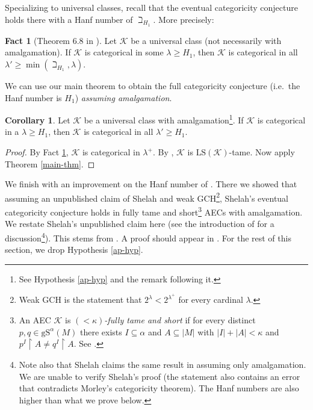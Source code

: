 \documentclass[12pt]{amsart}
\theoremstyle{definition}
\newtheorem{cor}[mydef]{Corollary}
\newtheorem{fact}[mydef]{Fact}
\begin{document}
Specializing to universal classes, recall that the eventual categoricity conjecture holds there with a Hanf number of $\beth_{H_1}$. More precisely:

\begin{fact}[Theorem 6.8 in \cite{ap-universal-v8}]\label{univ-fact}
  Let ${\mathcal{K}}$ be a universal class (not necessarily with amalgamation). If ${\mathcal{K}}$ is categorical in some $\lambda \ge H_1$, then ${\mathcal{K}}$ is categorical in all $\lambda' \ge \min (\beth_{H_1}, \lambda)$.
\end{fact}

We can use our main theorem to obtain the full categoricity conjecture (i.e.\ the Hanf number is $H_1$) \emph{assuming amalgamation}.

\begin{cor}\label{improved-univ-categ}
  Let ${\mathcal{K}}$ be a universal class with amalgamation\footnote{See Hypothesis \ref{ap-hyp} and the remark following it.}. If ${\mathcal{K}}$ is categorical in a $\lambda \ge H_1$, then ${\mathcal{K}}$ is categorical in all $\lambda' \ge H_1$.
\end{cor}
\begin{proof}
  By Fact \ref{univ-fact}, ${\mathcal{K}}$ is categorical in $\lambda^+$. By \cite[Corollary 3.8]{ap-universal-v8}, ${\mathcal{K}}$ is ${\text{LS}} ({\mathcal{K}})$-tame. Now apply Theorem \ref{main-thm}.
\end{proof}

We finish with an improvement on the Hanf number of \cite[Theorem 1.6]{indep-aec-v5}. There we showed that assuming an unpublished claim of Shelah and weak GCH\footnote{Weak GCH is the statement that $2^\lambda < 2^{\lambda^+}$ for every cardinal $\lambda$.}, Shelah's eventual categoricity conjecture holds in fully tame and short\footnote{An AEC ${\mathcal{K}}$ is \emph{$(<\kappa)$-fully tame and short} if for every distinct $p, q \in {\text{gS}}^{\alpha} (M)$ there exists $I \subseteq \alpha$ and $A \subseteq |M|$ with $|I| + |A| < \kappa$ and $p^I {\upharpoonright} A \neq q^I {\upharpoonright} A$. See \cite[Definitions 3.1,3.3]{tamelc-jsl}.} AECs with amalgamation. We restate Shelah's unpublished claim here (see the introduction of \cite{indep-aec-v5} for a discussion\footnote{Note also that Shelah claims the same result in \cite[Theorem IV.7.12]{shelahaecbook} assuming only amalgamation. We are unable to verify Shelah's proof (the statement also contains an error that contradicts Morley's categoricity theorem). The Hanf numbers are also higher than what we prove below.}). This stems from \cite[Discussion III.12.40]{shelahaecbook}. A proof should appear in \cite{sh842}. For the rest of this section, we drop Hypothesis \ref{ap-hyp}.
\end{document}
